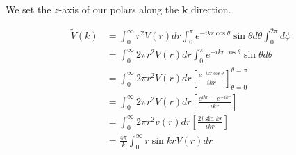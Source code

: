 \documentclass[11pt]{amsart}
\begin{document}
We set the $z$-axis of our polars along the $\mathbf{k}$ direction.

\begin{align*}
  \tilde{V}(k) &= \int_0^{\infty} r^2 V(r) dr \int_0^{\pi} e^{-ikr\cos{\theta}} \sin{\theta} d\theta \int_0^{2\pi} d\phi \\
               &= \int_0^{\infty} 2\pi r^2 V(r) dr \int_0^{\pi} e^{-ikr\cos{\theta}} \sin{\theta} d\theta \\
               &= \int_0^{\infty} 2\pi r^2 V(r) dr {\left[\frac{e^{-ikr\cos{\theta}}}{ikr}\right]}^{\theta = \pi}_{\theta = 0} \\
               &= \int_0^{\infty} 2\pi r^2 V(r) dr \left[\frac{e^{ikr} - e^{-ikr}}{ikr}\right] \\
               &= \int_0^{\infty} 2\pi r^2 v(r) dr \left[\frac{2i\sin{kr}}{ikr}\right] \\
               &= \frac{4\pi}{k}\int_0^{\infty} r\sin{kr} V(r) dr
\end{align*}
\end{document}
